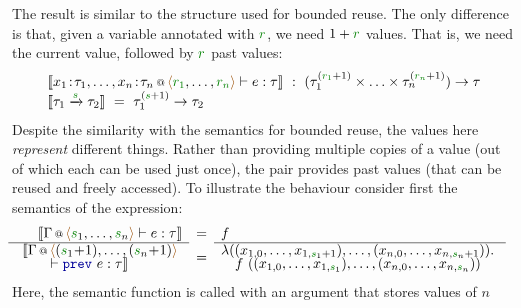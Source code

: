 The result is similar to the structure used for bounded reuse. The only difference is that, given
a variable annotated with $\cclrd{r}$, we need $1+\cclrd{r}$ values. That is, we need the current
value, followed by $\cclrd{r}$ past values:
%
\begin{equation*}
\begin{array}{l}
\sem{\coctx{x_1\!:\!\tau_1, \ldots, x_n\!:\!\tau_n}{ \alift{\cclrd{r_1}, \ldots, \cclrd{r_n}} } \vdash e : \tau}
  ~:~ (\tau^{(\cclrd{r_1}+1)}_1 \times \ldots \times \tau^{(\cclrd{r_n}+1)}_n) \rightarrow \tau\\
\sem{\tau_1 \xrightarrow{\cclrd{s}} \tau_2} ~=~ \tau_1^{(\cclrd{s}+1)} \rightarrow \tau_2
\end{array}
\end{equation*}
%
Despite the similarity with the semantics for bounded reuse, the values here \emph{represent}
different things. Rather than providing multiple copies of a value (out of which each can be
used just once), the pair provides past values (that can be reused and freely accessed).
To illustrate the behaviour consider first the semantics of the  expression:
%
\begin{equation*}
\hspace{-1em}
\begin{array}{l}
\emdeff
  {\coctx{\Gamma}{\alift{\cclrd{s}_1, \ldots, \cclrd{s}_n}} \vdash e : \tau}
  {\begin{array}{l}\sem{\coctx{\Gamma}{\alift{(\cclrd{s}_1 \hspace{-0.2em}+\hspace{-0.2em} 1), \ldots, (\cclrd{s}_n \hspace{-0.2em}+\hspace{-0.2em} 1)}}\\[-0.25em]
    \qquad\vdash \kvd{prev}~e : \tau}\end{array}\hspace{-0.5em}~}
  {f}
  {\hspace{-0.5em}\begin{array}{l}\lambda((x_{1,0}, \ldots, x_{1,{\cclrd{s}_1 + 1}}), \ldots, (x_{n,0}, \ldots, x_{n,{\cclrd{s}_n + 1}})).\\[-0.25em]
  \quad f~((x_{1,0}, \ldots, x_{1,\cclrd{s}_1}), \ldots, (x_{n,0}, \ldots, x_{n,\cclrd{s}_n}))\end{array}\hspace{-0.5em}~}
\end{array}
\end{equation*}
%
Here, the semantic function is called with an argument that stores values of $n$
